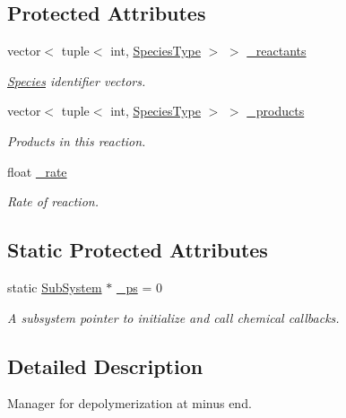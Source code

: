 \subsection*{Protected Attributes}
\begin{DoxyCompactItemize}
\item 
vector$<$ tuple$<$ int, \hyperlink{Species_8h_a50651af47c56ea0e27235468d23542cf}{Species\+Type} $>$ $>$ \hyperlink{classInternalFilamentRxnManager_a63de9061c3da4ad03cf4c530d2774979}{\+\_\+reactants}
\begin{DoxyCompactList}\small\item\em \hyperlink{classSpecies}{Species} identifier vectors. \end{DoxyCompactList}\item 
vector$<$ tuple$<$ int, \hyperlink{Species_8h_a50651af47c56ea0e27235468d23542cf}{Species\+Type} $>$ $>$ \hyperlink{classInternalFilamentRxnManager_afd213da1a3706e2e88962e5da886a5dc}{\+\_\+products}
\begin{DoxyCompactList}\small\item\em Products in this reaction. \end{DoxyCompactList}\item 
float \hyperlink{classInternalFilamentRxnManager_a8b98dd9e6f5d016149f5434b891806df}{\+\_\+rate}
\begin{DoxyCompactList}\small\item\em Rate of reaction. \end{DoxyCompactList}\end{DoxyCompactItemize}
\subsection*{Static Protected Attributes}
\begin{DoxyCompactItemize}
\item 
static \hyperlink{classSubSystem}{Sub\+System} $\ast$ \hyperlink{classInternalFilamentRxnManager_a973ce9cc2aae811e6867afa46193c5f2}{\+\_\+ps} = 0
\begin{DoxyCompactList}\small\item\em A subsystem pointer to initialize and call chemical callbacks. \end{DoxyCompactList}\end{DoxyCompactItemize}


\subsection{Detailed Description}
Manager for depolymerization at minus end. 

